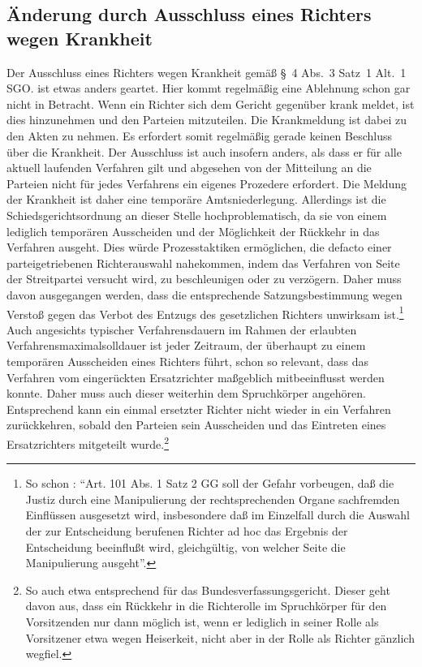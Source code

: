 \subsection{Änderung durch Ausschluss eines Richters wegen Krankheit}
\label{Zusammensetzung:Spruchkoerper:Krankheit}
Der Ausschluss eines Richters wegen Krankheit gemäß \S~4 Abs.~3 Satz~1 Alt.~1 SGO. ist etwas anders geartet.
Hier kommt regelmäßig eine Ablehnung schon gar nicht in Betracht.
Wenn ein Richter sich dem Gericht gegenüber krank meldet, ist dies hinzunehmen und den Parteien mitzuteilen.
Die Krankmeldung ist dabei zu den Akten zu nehmen.
Es erfordert somit regelmäßig gerade keinen Beschluss über die Krankheit.
Der Ausschluss ist auch insofern anders, als dass er für alle aktuell laufenden Verfahren gilt und abgesehen von der Mitteilung an die Parteien nicht für jedes Verfahrens ein eigenes Prozedere erfordert.
Die Meldung der Krankheit ist daher eine temporäre Amtsniederlegung.
Allerdings ist die Schiedsgerichtsordnung an dieser Stelle hochproblematisch, da sie von einem lediglich temporären Ausscheiden und der Möglichkeit der Rückkehr in das Verfahren ausgeht.
Dies würde Prozesstaktiken ermöglichen, die defacto einer parteigetriebenen Richterauswahl nahekommen, indem das Verfahren von Seite der Streitpartei versucht wird, zu beschleunigen oder zu verzögern.
Daher muss davon ausgegangen werden, dass die entsprechende Satzungsbestimmung wegen Verstoß gegen das Verbot des Entzugs des gesetzlichen Richters unwirksam ist.\footnote{So schon \cite[299]{BVerfGE17294}: \enquote{Art. 101 Abs. 1 Satz 2 GG soll der Gefahr vorbeugen, daß die Justiz durch eine Manipulierung der rechtsprechenden Organe sachfremden Einflüssen ausgesetzt wird, insbesondere daß im Einzelfall durch die Auswahl der zur Entscheidung berufenen Richter ad hoc das Ergebnis der Entscheidung beeinflußt wird, gleichgültig, von welcher Seite die Manipulierung ausgeht}.}
Auch angesichts typischer Verfahrensdauern im Rahmen der erlaubten Verfahrensmaximalsolldauer ist jeder Zeitraum, der überhaupt zu einem temporären Ausscheiden eines Richters führt, schon so relevant, dass das Verfahren vom eingerückten Ersatzrichter maßgeblich mitbeeinflusst werden konnte.
Daher muss auch dieser weiterhin dem Spruchkörper angehören.
Entsprechend kann ein einmal ersetzter Richter nicht wieder in ein Verfahren zurückkehren, sobald den Parteien sein Ausscheiden und das Eintreten eines Ersatzrichters mitgeteilt wurde.\footnote{So auch etwa \cite[Eschelbach][\S~15 Rn~31]{BVerfGGMitarbeiterKommentar} entsprechend für das Bundesverfassungsgericht. Dieser geht davon aus, dass ein Rückkehr in die Richterolle im Spruchkörper für den Vorsitzenden nur dann möglich ist, wenn er lediglich in seiner Rolle als Vorsitzener etwa wegen Heiserkeit, nicht aber in der Rolle als Richter gänzlich wegfiel.}

